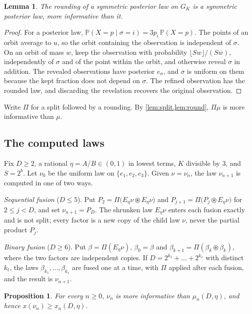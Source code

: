 \documentclass[11pt]{amsart}
\newtheorem{proposition}[theorem]{Proposition}
\newtheorem{lemma}[theorem]{Lemma}
\theoremstyle{definition}
\theoremstyle{remark}
\newcommand{\PP}{\mathbb{P}}
\begin{document}
\begin{lemma}\label{lem:round}
The rounding of a symmetric posterior law on $G_K$ is a symmetric posterior law, more informative than it.
\end{lemma}

\begin{proof}
For a posterior law, $\PP(X=p\mid\sigma=i)=3p_i\,\PP(X=p)$. The points of an orbit average to $u$, so the
orbit containing the observation is independent of $\sigma$. On an orbit of mass $w$, keep the observation
with probability $\lfloor Sw\rfloor/(Sw)$, independently of $\sigma$ and of the point within the orbit, and
otherwise reveal $\sigma$ in addition. The revealed observations have posterior $e_\sigma$, and $\sigma$ is
uniform on them because the kept fraction does not depend on $\sigma$. The refined observation has the rounded
law, and discarding the revelation recovers the original observation.
\end{proof}

Write $\Pi$ for a split followed by a rounding. By \cref{lem:split,lem:round}, $\Pi\mu$ is more informative
than $\mu$.

\subsection{The computed laws}
Fix $D\ge2$, a rational $\eta=A/B\in(0,1)$ in lowest terms, $K$ divisible by $3$, and $S=2^b$. Let $\nu_0$ be the
uniform law on $\{e_1,e_2,e_3\}$. Given $\nu=\nu_n$, the law $\nu_{n+1}$ is computed in one of two ways.

\emph{Sequential fusion} ($D\le5$). Put $P_2=\Pi\big(E_\eta\nu\circledast E_\eta\nu\big)$ and
$P_{j+1}=\Pi\big(P_j\circledast E_\eta\nu\big)$ for $2\le j<D$, and set $\nu_{n+1}=P_D$. The shrunken law
$E_\eta\nu$ enters each fusion exactly and is not split; every factor is a new copy of the child law $\nu$,
never the partial product $P_j$.

\emph{Binary fusion} ($D\ge6$). Put $\beta=\Pi(E_\eta\nu)$, $\beta_0=\beta$ and
$\beta_{k+1}=\Pi(\beta_k\circledast\beta_k)$, where the two factors are independent copies. If
$D=2^{k_1}+\dots+2^{k_s}$ with distinct $k_t$, the laws $\beta_{k_1},\dots,\beta_{k_s}$ are fused one at a time,
with $\Pi$ applied after each fusion, and the result is $\nu_{n+1}$.

\begin{proposition}\label{prop:dominate}
For every $n\ge0$, $\nu_n$ is more informative than $\mu_n(D,\eta)$, and hence $x(\nu_n)\ge x_n(D,\eta)$.
\end{proposition}
\end{document}
